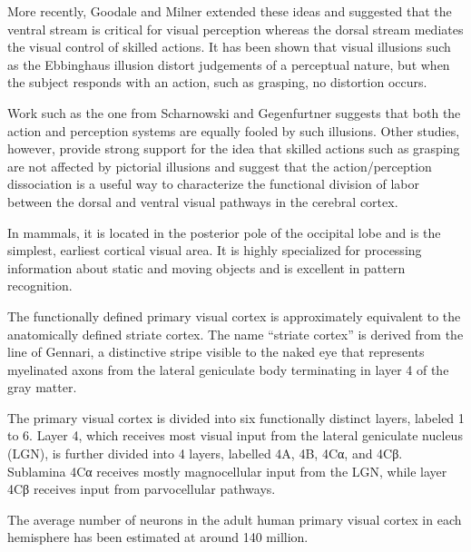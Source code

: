 \documentclass[]{book}
\begin{document}
More recently, Goodale and Milner extended these ideas and suggested that the ventral stream is critical for visual perception whereas the dorsal stream mediates the visual control of skilled actions. It has been shown that visual illusions such as the Ebbinghaus illusion distort judgements of a perceptual nature, but when the subject responds with an action, such as grasping, no distortion occurs.

Work such as the one from Scharnowski and Gegenfurtner suggests that both the action and perception systems are equally fooled by such illusions. Other studies, however, provide strong support for the idea that skilled actions such as grasping are not affected by pictorial illusions and suggest that the action/perception dissociation is a useful way to characterize the functional division of labor between the dorsal and ventral visual pathways in the cerebral cortex.

In mammals, it is located in the posterior pole of the occipital lobe and is the simplest, earliest cortical visual area. It is highly specialized for processing information about static and moving objects and is excellent in pattern recognition.

The functionally defined primary visual cortex is approximately equivalent to the anatomically defined striate cortex. The name ``striate cortex'' is derived from the line of Gennari, a distinctive stripe visible to the naked eye that represents myelinated axons from the lateral geniculate body terminating in layer 4 of the gray matter.

The primary visual cortex is divided into six functionally distinct layers, labeled 1 to 6. Layer 4, which receives most visual input from the lateral geniculate nucleus (LGN), is further divided into 4 layers, labelled 4A, 4B, 4Cα, and 4Cβ. Sublamina 4Cα receives mostly magnocellular input from the LGN, while layer 4Cβ receives input from parvocellular pathways.

The average number of neurons in the adult human primary visual cortex in each hemisphere has been estimated at around 140 million.
\end{document}
